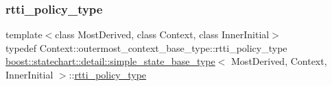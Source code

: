 \subsubsection{\texorpdfstring{rtti\+\_\+policy\+\_\+type}{rtti\_policy\_type}}
{\footnotesize\ttfamily template$<$class Most\+Derived, class Context, class Inner\+Initial$>$ \\
typedef Context\+::outermost\+\_\+context\+\_\+base\+\_\+type\+::rtti\+\_\+policy\+\_\+type \mbox{\hyperlink{structboost_1_1statechart_1_1detail_1_1simple__state__base__type}{boost\+::statechart\+::detail\+::simple\+\_\+state\+\_\+base\+\_\+type}}$<$ Most\+Derived, Context, Inner\+Initial $>$\+::\mbox{\hyperlink{structboost_1_1statechart_1_1detail_1_1simple__state__base__type_a6a41400b974abd80bbd4c10ed753745b}{rtti\+\_\+policy\+\_\+type}}\hspace{0.3cm}{\ttfamily [private]}}

\mbox{\label{structboost_1_1statechart_1_1detail_1_1simple__state__base__type_af90a0a8f976dd22839145952facf37b7}} 
